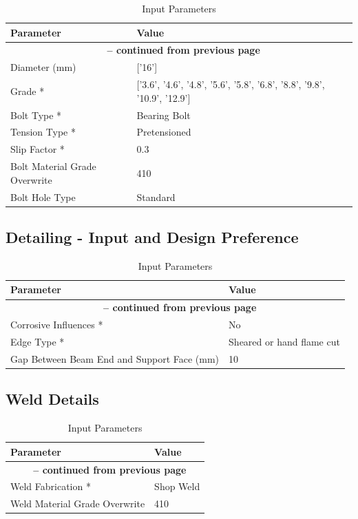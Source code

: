 \documentclass[12pt]{article}
\begin{document}
\begin{longtable}{ll}
\caption{Input Parameters}
\label{tab:input}
Parameter & Value \\ \hline
\endfirsthead
\multicolumn{2}{c}{{\bfseries \tablename\ \thetable{} -- continued from previous page}} \\
\endhead
\endfoot
\endlastfoot
Diameter (mm) & ['16'] \\
\hline
Grade * & ['3.6', '4.6', '4.8', '5.6', '5.8', '6.8', '8.8', '9.8', '10.9', '12.9'] \\
\hline
Bolt Type * & Bearing Bolt \\
\hline
Tension Type * & Pretensioned \\
\hline
Slip Factor * & 0.3 \\
\hline
Bolt Material Grade Overwrite & 410 \\
\hline
Bolt Hole Type & Standard \\
\hline
\end{longtable}

\FloatBarrier

\subsection{Detailing - Input and Design Preference}

\begin{longtable}{ll}
\caption{Input Parameters}
\label{tab:input}
Parameter & Value \\ \hline
\endfirsthead
\multicolumn{2}{c}{{\bfseries \tablename\ \thetable{} -- continued from previous page}} \\
\endhead
\endfoot
\endlastfoot
Corrosive Influences * & No \\
\hline
Edge Type * & Sheared or hand flame cut \\
\hline
Gap Between Beam End and Support Face (mm) & 10 \\
\hline
\end{longtable}

\FloatBarrier

\subsection{Weld Details}

\begin{longtable}{ll}
\caption{Input Parameters}
\label{tab:input}
Parameter & Value \\ \hline
\endfirsthead
\multicolumn{2}{c}{{\bfseries \tablename\ \thetable{} -- continued from previous page}} \\
\endhead
\endfoot
\endlastfoot
Weld Fabrication * & Shop Weld \\
\hline
Weld Material Grade Overwrite & 410 \\
\hline
\end{longtable}
\end{document}
